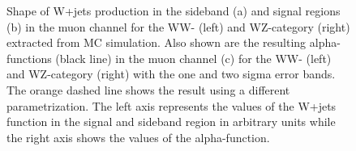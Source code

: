 \begin{figure}
	\centering
	\caption[Shape of W+jets production in the sideband and signal regions as well as the resulting alpha-function]{Shape of W+jets production in the sideband (a) and signal regions (b) in the muon channel for the WW- (left) and WZ-category (right) extracted from MC simulation. Also shown are the resulting alpha-functions (black line) in the muon channel (c) for the WW- (left) and WZ-category (right) with the one and two sigma error bands. The orange dashed line shows the result using a different parametrization. The left axis represents the values of the W+jets function in the signal and sideband region in arbitrary units while the right axis shows the values of the alpha-function.}
	\label{fig:bkg:mwvmc_alpha_mu}
\end{figure}	

